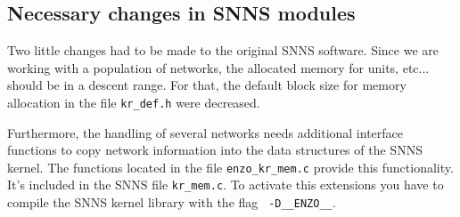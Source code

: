\subsection{Necessary changes  in SNNS modules}

Two little changes had to be made to the original SNNS software.
Since we are working with a population of networks, the allocated memory
for units, etc... should be in a descent range. For that, the default block size
for memory allocation in the file \verb+kr_def.h+ were decreased.

Furthermore, the handling of several networks needs additional interface
functions to copy network information into the data structures of the SNNS kernel.
The functions located in the file \verb+enzo_kr_mem.c+ provide this functionality.
It's included in the SNNS file \verb+kr_mem.c+.
To activate this extensions you have to compile the SNNS kernel library
with the flag \verb+ -D__ENZO__+. 




